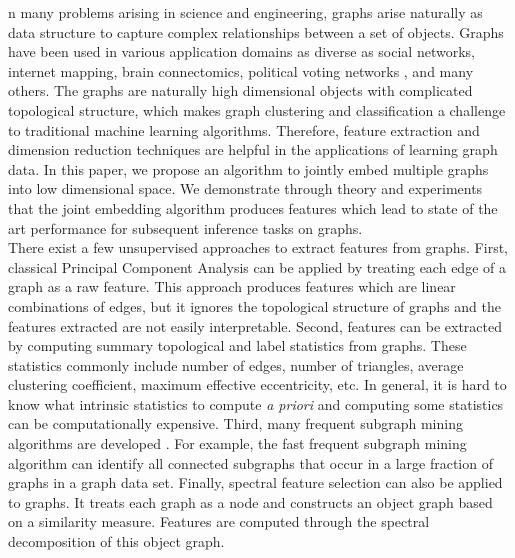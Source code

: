 \documentclass[10pt,journal,compsoc]{IEEEtran}
\begin{document}
\IEEEdisplaynontitleabstractindextext
\IEEEpeerreviewmaketitle


\noindent {}n many problems arising in science and engineering, graphs arise naturally as data structure to capture complex relationships between a set of objects. Graphs have been used in various application domains as diverse as social networks\cite{otte2002social}, internet mapping\cite{govindan2000heuristics}, brain connectomics\cite{bullmore2011brain}, political voting networks \cite{ward2011network},  and many others. The graphs are naturally high dimensional objects with complicated topological structure, which makes graph clustering and classification a challenge to traditional machine learning algorithms. Therefore, feature extraction and dimension reduction techniques are helpful in the applications of learning graph data. In this paper, we propose an algorithm to jointly embed multiple graphs into low dimensional space. We demonstrate through theory and experiments that the joint embedding algorithm produces features which lead to state of the art performance for subsequent inference tasks on graphs.  \\

\noindent There exist a few unsupervised approaches to extract features from graphs. First, classical Principal Component Analysis can be applied by treating each edge of a graph as a raw feature\cite{jolliffe2002principal}. This approach produces features which are linear combinations of edges, but it ignores the topological structure of graphs and the features extracted are not easily interpretable. Second, features can be extracted by computing summary topological and label statistics from graphs\cite{li2011graph}. These statistics commonly include number of edges, number of triangles, average clustering coefficient, maximum effective eccentricity, etc. In general, it is hard to know what intrinsic statistics to compute \textit{a priori} and computing some statistics can be computationally expensive. Third, many frequent subgraph mining algorithms are developed \cite{jiang2013survey}. For example, the fast frequent subgraph mining algorithm can identify all connected subgraphs that occur in a large fraction of graphs in a graph data set\cite{huan2003efficient}. Finally, spectral feature selection can also be applied to graphs. It treats each graph as a node and constructs an object graph based on a similarity measure. Features are computed through the spectral decomposition of this object graph\cite{zhao2007spectral}. \\
\end{document}
